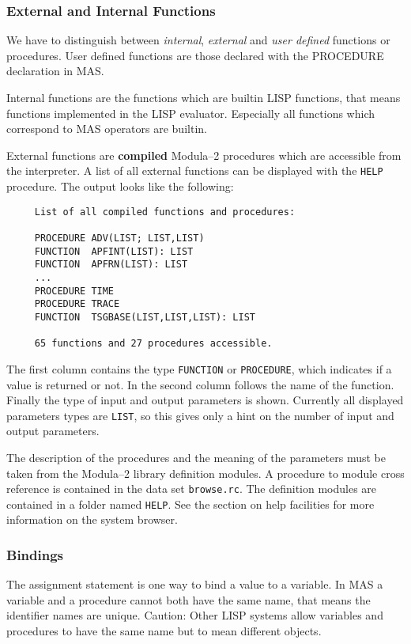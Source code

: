 \subsubsection{External and Internal Functions}

We have to distinguish between {\em internal},
{\em external} and {\em user defined} functions or procedures.
User defined functions are those declared with the
PROCEDURE declaration in MAS.

Internal functions are the functions which are builtin 
LISP functions, that means functions implemented in the 
LISP evaluator. Especially all functions which 
correspond to MAS operators are builtin.  

External functions are {\bf compiled} Modula--2 procedures 
which are accessible from the interpreter.
A list of all external functions can be displayed 
with the \verb/HELP/ procedure.
The output looks like the following: 
{\small
\begin{verbatim}
     List of all compiled functions and procedures: 

     PROCEDURE ADV(LIST; LIST,LIST)
     FUNCTION  APFINT(LIST): LIST
     FUNCTION  APFRN(LIST): LIST
     ...
     PROCEDURE TIME
     PROCEDURE TRACE
     FUNCTION  TSGBASE(LIST,LIST,LIST): LIST

     65 functions and 27 procedures accessible.
\end{verbatim}
}
The first column contains the type \verb/FUNCTION/ 
or \verb/PROCEDURE/, which indicates if a value is
returned or not. In the second column follows 
the name of the function. Finally the type of
input and output parameters is shown. 
Currently all displayed parameters types are \verb/LIST/,
so this gives only a hint on the number of input 
and output parameters. 

The description of the procedures and the meaning of the
parameters must be taken from the 
Modula--2 library definition modules.
A procedure to module cross reference is contained in
the data set \verb/browse.rc/. 
The definition modules are contained in a folder
named \verb/HELP/.
See the section on help facilities for more
information on the system browser. 


\subsubsection{Bindings}

The assignment statement is one way to bind a value to 
a variable. In MAS a variable and a procedure cannot 
both have the same name, that means the identifier names are 
unique. 
Caution: Other LISP systems allow variables and procedures 
to have the same name but to mean different objects. 

